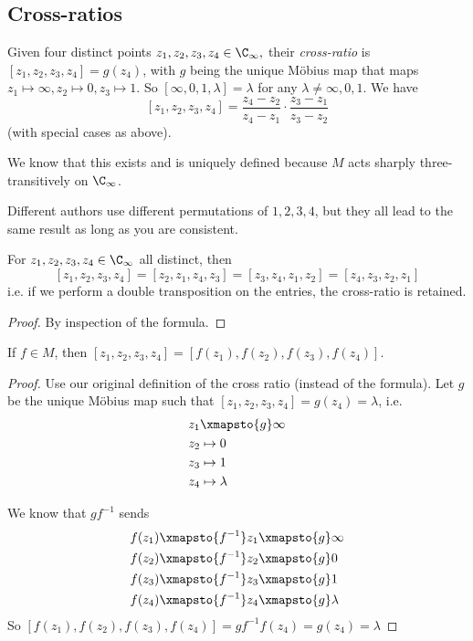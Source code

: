 \documentclass[a4pape]{article}
\begin{document}
\subsection{Cross-ratios}
\begin{defi}
  Given four distinct points $z_1, z_2, z_3, z_4\in \C_\infty,$ their \emph{cross-ratio} is $[z_1, z_2, z_3, z_4] = g(z_4)$, with $g$ being the unique M\"obius map that maps $z_1\mapsto \infty, z_2\mapsto 0, z_3\mapsto 1$.  So $[\infty, 0, 1, \lambda] = \lambda$ for any $\lambda\not= \infty, 0, 1$. We have
  \[
  [z_1, z_2, z_3, z_4] = \frac{z_4 - z_2}{z_4 - z_1} \cdot \frac{z_3 - z_1}{z_3 - z_2}
  \]
(with special cases as above).
\end{defi}
We know that this exists and is uniquely defined because $M$ acts sharply three-transitively on $\C_\infty$.

\note Different authors use different permutations of $1, 2, 3, 4$, but they all lead to the same result as long as you are consistent.

\begin{lemma}
  For $z_1, z_2, z_3, z_4\in \C_\infty$ all distinct, then
  \[
  [z_1, z_2, z_3, z_4] = [z_2, z_1, z_4, z_3] = [z_3, z_4, z_1, z_2] = [z_4, z_3, z_2, z_1]
  \]
  i.e. if we perform a double transposition on the entries, the cross-ratio is retained.
\end{lemma}

\begin{proof}
  By inspection of the formula.
\end{proof}

\begin{prop}
  If $f\in M$, then $[z_1, z_2, z_3, z_4] = [f(z_1), f(z_2), f(z_3), f(z_4)]$.
\end{prop}

\begin{proof}
  Use our original definition of the cross ratio (instead of the formula). Let $g$ be the unique M\"obius map such that $[z_1, z_2, z_3, z_4] = g(z_4) = \lambda$, i.e.
  \begin{align*}
    z_1 &\xmapsto{g} \infty\\
    z_2 &\mapsto 0\\
    z_3 &\mapsto 1\\
    z_4 &\mapsto \lambda
  \end{align*}

  We know that $gf^{-1}$ sends
  \begin{align*}
    f(z_1)\xmapsto{f^{-1}} z_1 &\xmapsto{g} \infty\\
    f(z_2)\xmapsto{f^{-1}} z_2 &\xmapsto{g} 0\\
    f(z_3)\xmapsto{f^{-1}} z_3 &\xmapsto{g} 1\\
    f(z_4)\xmapsto{f^{-1}} z_4 &\xmapsto{g} \lambda
  \end{align*}
So $[f(z_1), f(z_2), f(z_3), f(z_4)] = gf^{-1}f(z_4) = g(z_4) = \lambda$
\end{proof}
\end{document}
